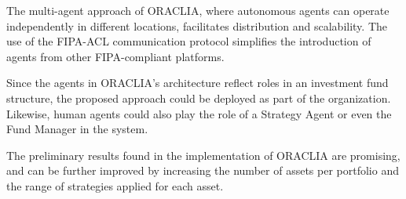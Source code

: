 \documentclass{aamas2017-extabs}
\begin{document}
The multi-agent approach of ORACLIA, where autonomous agents can operate independently in different locations, facilitates distribution and scalability. The use of the FIPA-ACL communication protocol simplifies the introduction of agents from other FIPA-compliant platforms.

Since the agents in ORACLIA's architecture reflect roles in an investment fund structure, the proposed approach could be deployed as part of the organization. Likewise, human agents could also play the role of a Strategy Agent or even the Fund Manager in the system.

The preliminary results found in the implementation of ORACLIA are promising, and can be further improved by increasing the number of assets per portfolio and the range of strategies applied for each asset.

% 
%  
\end{document}
